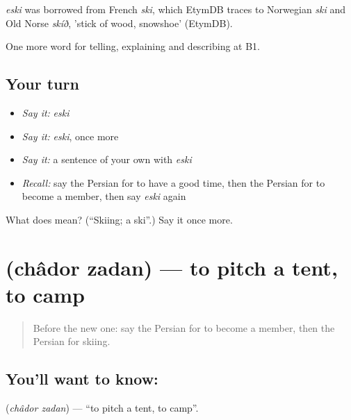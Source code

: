 \begin{cousinweb}
\emph{eski} was borrowed from French \emph{ski}, which EtymDB traces to Norwegian \emph{ski} and Old Norse \emph{skíð}, 'stick of wood, snowshoe' (EtymDB).
\end{cousinweb}

\begin{grammarlens}[title={What you've built}]
One more word for telling, explaining and describing at B1.
\end{grammarlens}

\subsection*{Your turn}
\begin{itemize}
\raggedright
  \item \emph{Say it:} \emph{eski}
  \item \emph{Say it:} \emph{eski}, once more
  \item \emph{Say it:} a sentence of your own with \emph{eski}
  \item \emph{Recall:} say the Persian for to have a good time, then the Persian for to become a member, then say \emph{eski} again
\end{itemize}

\begin{tcolorbox}[breakable,colback=teal!4,colframe=teal!35!black,title={Before you move on}]
What does  mean? (\textquotedblleft{}Skiing; a ski\textquotedblright{}.) Say it once more.
\end{tcolorbox}
\section[\texorpdfstring{\fa{چادر} \fa{زدن} (châdor zadan)}{چادر زدن (châdor zadan)}]{  (châdor zadan) — to pitch a tent, to camp}

\label{lesson:FA-C511-chador-zadan}



\begin{quote}
Before the new one: say the Persian for to become a member, then the Persian for skiing.
\end{quote}

\subsection*{You'll want to know:  }
\textbf{ } (\emph{châdor zadan}) — \textquotedblleft{}to pitch a tent, to camp\textquotedblright{}.

